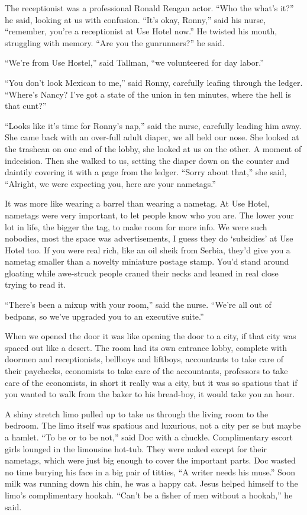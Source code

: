 \documentclass[oneside]{book}
\begin{document}
The receptionist was a professional Ronald Reagan actor.  ``Who the what's it?'' he said, looking at us
with confusion.  ``It's okay, Ronny,'' said his nurse, ``remember, you're a receptionist at Use Hotel now.''
He twisted his mouth, struggling with memory.  ``Are you the gunrunners?'' he said.

``We're from Use Hostel,'' said Tallman, ``we volunteered for day labor.''

``You don't look Mexican to me,'' said Ronny, carefully leafing through the ledger.  ``Where's Nancy?
I've got a state of the union in ten minutes, where the hell is that cunt?''

``Looks like it's time for Ronny's nap,'' said the nurse, carefully leading him away.
She came back with an over-full adult diaper, we all held our nose.  She looked at the trashcan on
one end of the lobby, she looked at us on the other.  A moment of indecision.  Then she walked to us,
setting the diaper down on the counter and daintily covering it with a page from the ledger.
``Sorry about that,'' she said, ``Alright, we were expecting you, here are your nametags.''

It was more like wearing a barrel than wearing a nametag.
At Use Hotel, nametags were very important, to let people know who you are.  The lower your lot in life,
the bigger the tag, to make room for more info.  We were such nobodies, most the space was
advertisements, I guess they do `subsidies' at Use Hotel too.  If you were real rich, like
an oil sheik from Serbia, they'd give you a nametag smaller than a novelty miniature postage stamp.
You'd stand around gloating while awe-struck people craned their necks and leaned in real close trying
to read it.

``There's been a mixup with your room,'' said the nurse.  ``We're all out of bedpans, so we've upgraded
you to an executive suite.''


When we opened the door it was like opening the door to a city, if that city was spaced out like a desert.
The room had its own entrance lobby, complete with doormen and receptionists, bellboys and liftboys,
accountants to take care of their paychecks, economists to take care of the accountants, professors to
take care of the economists, in short it really was a city, but it was so spatious that if you wanted
to walk from the baker to his bread-boy, it would take you an hour.

A shiny stretch limo pulled up to take us through the living room to the bedroom.
The limo itself was spatious and luxurious, not a city per se but maybe a hamlet.
``To be or to be not,'' said Doc with a chuckle.
Complimentary escort girls lounged in the limousine hot-tub.  They were naked except for their nametags,
which were just big enough to cover the important parts.  Doc wasted no time burying his face in a big pair
of titties, ``A writer needs his muse.''  Soon milk was running down his chin, he was a happy cat.
Jesus helped himself to the limo's complimentary hookah.  ``Can't be a fisher of men without a hookah,''
he said.
\end{document}
